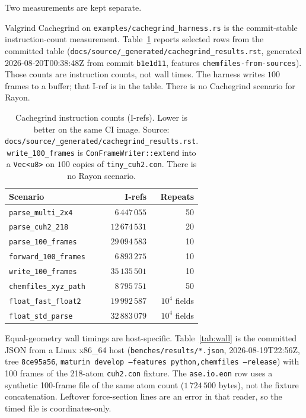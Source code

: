 \documentclass[preprint,12pt]{elsarticle}
\begin{document}
Two measurements are kept separate.

Valgrind Cachegrind on \texttt{examples/cachegrind\_harness.rs} is
the commit-stable instruction-count measurement.
Table~\ref{tab:cachegrind} reports selected rows from the
committed table
(\texttt{docs/source/\_generated/cachegrind\_results.rst}, generated
2026-08-20T00:38:48Z from commit \texttt{b1e1d11}, features
\texttt{chemfiles-from-sources}). Those counts are instruction
counts, not wall times. The harness writes $100$ frames to a
buffer; that I-ref is in the table. There is no Cachegrind
scenario for Rayon.

\begin{table}[ht]
\centering
\caption{Cachegrind instruction counts (I-refs). Lower is better on
the same CI image. Source:
\texttt{docs/source/\_generated/cachegrind\_results.rst}.
\texttt{write\_100\_frames} is \texttt{ConFrameWriter::extend} into
a \texttt{Vec<u8>} on $100$ copies of \texttt{tiny\_cuh2.con}.
There is no Rayon scenario.}
\label{tab:cachegrind}
\begin{tabular}{lrr}
\toprule
Scenario & I-refs & Repeats \\
\midrule
\texttt{parse\_multi\_2x4} & $6\,447\,055$ & 50 \\
\texttt{parse\_cuh2\_218} & $12\,674\,531$ & 20 \\
\texttt{parse\_100\_frames} & $29\,094\,583$ & 10 \\
\texttt{forward\_100\_frames} & $6\,893\,275$ & 10 \\
\texttt{write\_100\_frames} & $35\,135\,501$ & 10 \\
\texttt{chemfiles\_xyz\_path} & $8\,795\,751$ & 50 \\
\texttt{float\_fast\_float2} & $19\,992\,587$ & $10^{4}$ fields \\
\texttt{float\_std\_parse} & $32\,883\,079$ & $10^{4}$ fields \\
\bottomrule
\end{tabular}
\end{table}

Equal-geometry wall timings are host-specific. Table~\ref{tab:wall}
is the committed JSON from a Linux x86\_64 host
(\texttt{benches/results/*.json}, 2026-08-19T22:56Z, tree
\texttt{8ce95a56},
\texttt{maturin develop --features python,chemfiles --release})
with 100 frames of the 218-atom \texttt{cuh2.con} fixture. The
\texttt{ase.io.eon} row uses a synthetic 100-frame file of the same
atom count ($1\,724\,500$ bytes), not the fixture concatenation.
Leftover force-section lines are an error in that reader, so the
timed file is coordinates-only.
\end{document}
